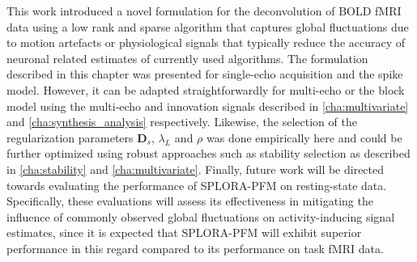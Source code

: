 This work introduced a novel formulation for the deconvolution of BOLD fMRI data
using a low rank and sparse algorithm that captures global fluctuations due to
motion artefacts or physiological signals that typically reduce the accuracy of
neuronal related estimates of currently used algorithms. The formulation
described in this chapter was presented for single-echo acquisition and the
spike model. However, it can be adapted straightforwardly for multi-echo
\citep{CaballeroGaudes2019deconvolutionalgorithmmulti} or the block model
\citep{Karahanoglu2013TotalactivationfMRI,Cherkaoui2019Sparsitybasedblind,Urunuela2023HemodynamicDeconvolutionDemystified}
using the multi-echo and innovation signals described in \cref{cha:multivariate}
and \cref{cha:synthesis_analysis} respectively. Likewise, the selection of the
regularization parameters $\mathbf{D}_s$, $\lambda_L$ and $\rho$ was done
empirically here and could be further optimized using robust approaches such as
stability selection
\citep{Meinshausen2010Stabilityselection,Urunuela2020StabilityBasedSparse} as
described in \cref{cha:stability} and \cref{cha:multivariate}. Finally, future
work will be directed towards evaluating the performance of SPLORA-PFM on
resting-state data. Specifically, these evaluations will assess its
effectiveness in mitigating the influence of commonly observed global
fluctuations on activity-inducing signal estimates, since it is expected that
SPLORA-PFM will exhibit superior performance in this regard compared to its
performance on task fMRI data.
